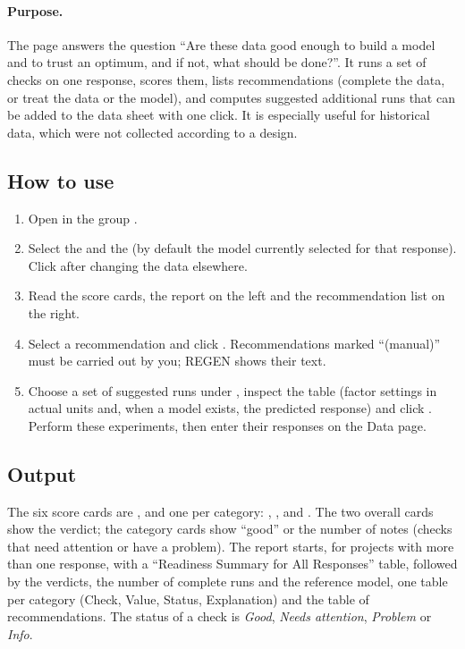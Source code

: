\paragraph{Purpose.} The  page answers the question ``Are these data good enough to build a
model and to trust an optimum, and if not, what should be done?''. It runs a set of checks on one response, scores
them, lists recommendations (complete the data, or treat the data or the model), and computes suggested additional
runs that can be added to the data sheet with one click. It is especially useful for historical data, which were not
collected according to a design.

\subsection{How to use}
\begin{enumerate}
\item Open  in the group .
\item Select the  and the  (by default the model currently selected for that
response). Click  after changing the data elsewhere.
\item Read the score cards, the report on the left and the recommendation list on the right.
\item Select a recommendation and click . Recommendations marked ``(manual)'' must
be carried out by you; REGEN shows their text.
\item Choose a set of suggested runs under , inspect the table (factor settings in actual units
and, when a model exists, the predicted response) and click . Perform these
experiments, then enter their responses on the Data page.
\end{enumerate}

\subsection{Output}
The six score cards are ,  and one per category: , ,  and . The
two overall cards show the verdict; the category cards show ``good'' or the number of notes (checks that need
attention or have a problem). The report starts, for projects with more than one response, with a ``Readiness
Summary for All Responses'' table, followed by the verdicts, the number of complete runs and the reference model, one
table per category (Check, Value, Status, Explanation) and the table of recommendations. The status of a check is
\emph{Good}, \emph{Needs attention}, \emph{Problem} or \emph{Info}.

